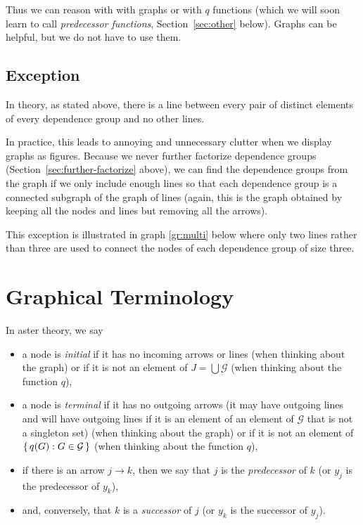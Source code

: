 Thus we can reason with with graphs or with $q$ functions (which we will
soon learn to call \emph{predecessor functions}, Section~\ref{sec:other} below).
Graphs can be helpful, but we do not have to use them.

\subsection{Exception}
\label{sec:exception-dependence-group-lines}

In theory, as stated above, there is a line between every pair of distinct
elements of every dependence group and no other lines.

In practice, this leads to annoying and unnecessary clutter
when we display graphs as figures.
Because we never further factorize dependence groups
(Section~\ref{sec:further-factorize} above), we can find the dependence
groups from the graph if we only include enough lines so that each
dependence group is a connected subgraph of the graph of lines
(again, this is the graph obtained by keeping all the nodes and lines but
removing all the arrows).

This exception is illustrated in graph \eqref{gr:multi} below
where only two lines
rather than three are used to connect the nodes of each
dependence group of size three.

\section{Graphical Terminology}
\label{sec:graphical-terminology}

In aster theory, we say
\begin{itemize}
\item a node is \emph{initial} if it has no incoming arrows
    or lines (when thinking about the graph) or if it is not an element
    of $J = \bigcup \mathcal{G}$ (when thinking about the function $q$),
\item a node is \emph{terminal} if it has no outgoing arrows
    (it may have outgoing lines and will have outgoing lines if it is
    an element of an element of $\mathcal{G}$ that is not a singleton set)
    (when thinking about the graph) or if it is not an element
    of $\{\,  q(G) : G \in \mathcal{G}  \,\}$
    (when thinking about the function $q$),
\item if there is an arrow $j \longrightarrow k$, then we say that $j$
    is the \emph{predecessor} of $k$ (or $y_j$ is the predecessor of $y_k$),
\item and, conversely, that $k$ is a \emph{successor} of $j$
    (or $y_k$ is the successor of $y_j$).
\end{itemize}

